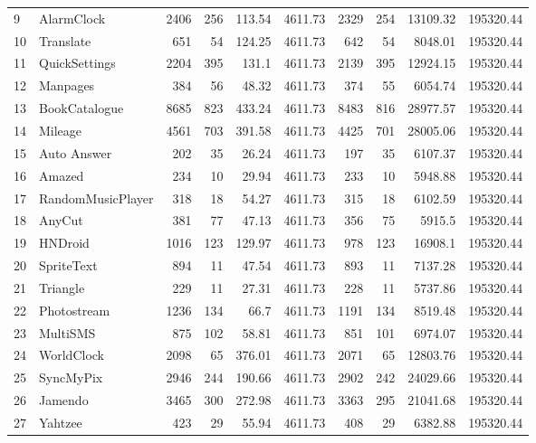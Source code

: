 \begin{landscape}
\begin{table}[]
{\begin{tabular}{llrrrrrrrr}
				9&AlarmClock&2406&256&113.54&4611.73&2329&254&13109.32&195320.44\\
				10&Translate&651&54&124.25&4611.73&642&54&8048.01&195320.44\\
				11&QuickSettings&2204&395&131.1&4611.73&2139&395&12924.15&195320.44\\
				12&Manpages&384&56&48.32&4611.73&374&55&6054.74&195320.44\\
				13&BookCatalogue&8685&823&433.24&4611.73&8483&816&28977.57&195320.44\\
				14&Mileage&4561&703&391.58&4611.73&4425&701&28005.06&195320.44\\
				15&Auto Answer&202&35&26.24&4611.73&197&35&6107.37&195320.44\\
				16&Amazed&234&10&29.94&4611.73&233&10&5948.88&195320.44\\
				17&RandomMusicPlayer&318&18&54.27&4611.73&315&18&6102.59&195320.44\\
				18&AnyCut&381&77&47.13&4611.73&356&75&5915.5&195320.44\\
				19&HNDroid&1016&123&129.97&4611.73&978&123&16908.1&195320.44\\
				20&SpriteText&894&11&47.54&4611.73&893&11&7137.28&195320.44\\
				21&Triangle&229&11&27.31&4611.73&228&11&5737.86&195320.44\\
				22&Photostream&1236&134&66.7&4611.73&1191&134&8519.48&195320.44\\
				23&MultiSMS&875&102&58.81&4611.73&851&101&6974.07&195320.44\\
				24&WorldClock&2098&65&376.01&4611.73&2071&65&12803.76&195320.44\\
				25&SyncMyPix&2946&244&190.66&4611.73&2902&242&24029.66&195320.44\\
				26&Jamendo&3465&300&272.98&4611.73&3363&295&21041.68&195320.44\\
				27&Yahtzee&423&29&55.94&4611.73&408&29&6382.88&195320.44\\
		\end{tabular}}
	\end{table}
\end{landscape}


